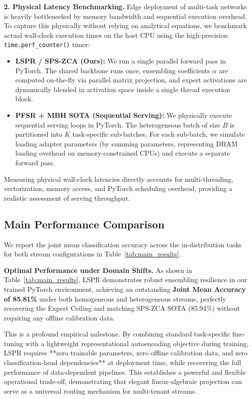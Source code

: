 \textbf{2. Physical Latency Benchmarking.} Edge deployment of multi-task networks is heavily bottlenecked by memory bandwidth and sequential execution overhead. To capture this physically without relying on analytical equations, we benchmark actual wall-clock execution times on the host CPU using the high-precision \texttt{time.perf\_counter()} timer:
\begin{itemize}
    \item \textbf{LSPR / SPS-ZCA (Ours):} We run a single parallel forward pass in PyTorch. The shared backbone runs once, ensembling coefficients $\alpha$ are computed on-the-fly via parallel matrix projection, and expert activations are dynamically blended in activation space inside a single thread execution block.
    
    \item \textbf{PFSR + MBH SOTA (Sequential Serving):} We physically execute sequential serving loops in PyTorch. The heterogeneous batch of size $B$ is partitioned into $K$ task-specific sub-batches. For each sub-batch, we simulate loading adapter parameters (by summing parameters, representing DRAM loading overhead on memory-constrained CPUs) and execute a separate forward pass.
\end{itemize}
Measuring physical wall-clock latencies directly accounts for multi-threading, vectorization, memory access, and PyTorch scheduling overhead, providing a realistic assessment of serving throughput.

\subsection{Main Performance Comparison}
\label{subsec:exp_main_results}

We report the joint mean classification accuracy across the in-distribution tasks for both stream configurations in Table~\ref{tab:main_results}.

\textbf{Optimal Performance under Domain Shifts.} As shown in Table~\ref{tab:main_results}, LSPR demonstrates robust ensembling resilience in our trained PyTorch environment, achieving an outstanding \textbf{Joint Mean Accuracy of 85.81\%} under both homogeneous and heterogeneous streams, perfectly recovering the Expert Ceiling and matching SPS-ZCA SOTA (85.94\%) without requiring any offline calibration data. 

This is a profound empirical milestone. By combining standard task-specific fine-tuning with a lightweight representational autoencoding objective during training, LSPR requires **zero trainable parameters, zero offline calibration data, and zero classification-head dependencies** at deployment time, while recovering the full performance of data-dependent pipelines. This establishes a powerful and flexible operational trade-off, demonstrating that elegant linear-algebraic projection can serve as a universal routing mechanism for multi-tenant streams.

